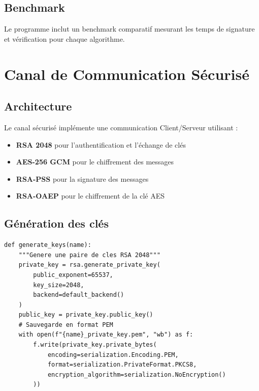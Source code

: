 \documentclass[12pt,a4paper]{report}
\begin{document}
\section{Benchmark}
Le programme inclut un benchmark comparatif mesurant les temps de signature et vérification pour chaque algorithme.

\chapter{Canal de Communication Sécurisé}

\section{Architecture}
Le canal sécurisé implémente une communication Client/Serveur utilisant :
\begin{itemize}
    \item \textbf{RSA 2048} pour l'authentification et l'échange de clés
    \item \textbf{AES-256 GCM} pour le chiffrement des messages
    \item \textbf{RSA-PSS} pour la signature des messages
    \item \textbf{RSA-OAEP} pour le chiffrement de la clé AES
\end{itemize}

\section{Génération des clés}
\begin{lstlisting}[style=python,caption=keygen.py]
def generate_keys(name):
    """Genere une paire de cles RSA 2048"""
    private_key = rsa.generate_private_key(
        public_exponent=65537,
        key_size=2048,
        backend=default_backend()
    )
    public_key = private_key.public_key()
    # Sauvegarde en format PEM
    with open(f"{name}_private_key.pem", "wb") as f:
        f.write(private_key.private_bytes(
            encoding=serialization.Encoding.PEM,
            format=serialization.PrivateFormat.PKCS8,
            encryption_algorithm=serialization.NoEncryption()
        ))
\end{lstlisting}
\end{document}
